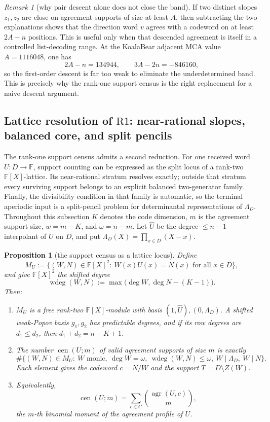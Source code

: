 \documentclass[11pt]{article}
\newtheorem{proposition}[proposition]{Proposition}
\theoremstyle{definition}
\theoremstyle{remark}
\newtheorem{remark}[remark]{Remark}
\newcommand{\F}{\mathbb{F}}
\providecommand{\Rone}{\mathrm{R1}}
\providecommand{\Cen}{\operatorname{cen}}
\providecommand{\wdeg}{\operatorname{wdeg}}
\begin{document}
\begin{remark}[why pair descent alone does not close the band]\label{rem:capfr1-pair-descent-gap}
If two distinct slopes \(z_1,z_2\) are close on agreement supports of size at least \(A\), then subtracting the two explanations shows that the direction word \(v\) agrees with a codeword on at least \(2A-n\) positions.  This is useful only when that descended agreement is itself in a controlled list-decoding range.  At the KoalaBear adjacent MCA value \(A=1116048\), one has
\[
        2A-n=134944,
        \qquad
        3A-2n=-846160,
\]
so the first-order descent is far too weak to eliminate the underdetermined band.  This is precisely why the rank-one support census is the right replacement for a naive descent argument.
\end{remark}

\subsection{Lattice resolution of \texorpdfstring{$\Rone$}{R1}: near-rational slopes, balanced core, and split pencils}\label{subsec:capfr1-lattice-split}

The rank-one support census admits a second reduction.  For one received word \(U:D\to\F\), support counting can be expressed as the split locus of a rank-two \(\F[X]\)-lattice.  Its near-rational stratum resolves exactly; outside that stratum every surviving support belongs to an explicit balanced two-generator family.  Finally, the divisibility condition in that family is automatic, so the terminal aperiodic input is a split-pencil problem for determinantal representations of \(\Lambda_D\).  Throughout this subsection \(K\) denotes the code dimension, \(m\) is the agreement support size, \(w=m-K\), and \(\omega=n-m\).  Let \(\widehat U\) be the degree-\(\le n-1\) interpolant of \(U\) on \(D\), and put \(\Lambda_D(X)=\prod_{x\in D}(X-x)\).

\begin{proposition}[the support census as a lattice locus]\label{prop:capfr1-lattice-census}
Define
\[
        M_U:=\{(W,N)\in\F[X]^2:\ W(x)U(x)=N(x)\text{ for all }x\in D\},
\]
and give \(\F[X]^2\) the shifted degree
\[
        \wdeg(W,N):=\max\bigl(\deg W,\deg N-(K-1)\bigr).
\]
Then:
\begin{enumerate}[label=\textup{(\alph*)}]
\item \(M_U\) is a free rank-two \(\F[X]\)-module with basis \((1,\widehat U),(0,\Lambda_D)\).  A shifted weak-Popov basis \(g_1,g_2\) has predictable degrees, and if its row degrees are \(d_1\le d_2\), then \(d_1+d_2=n-K+1\).
\item The number \(\Cen(U;m)\) of valid agreement supports of size \(m\) is exactly
\[
        \#\{(W,N)\in M_U:\ W\text{ monic},\ \deg W=\omega,\ \wdeg(W,N)\le\omega,\ W\mid\Lambda_D,\ W\mid N\}.
\]
Each element gives the codeword \(c=N/W\) and the support \(T=D\setminus Z(W)\).
\item Equivalently,
\[
        \Cen(U;m)=\sum_{c\in C}\binom{\operatorname{agr}(U,c)}{m},
\]
the \(m\)-th binomial moment of the agreement profile of \(U\).
\end{enumerate}
\end{proposition}
\end{document}
